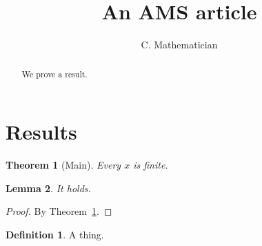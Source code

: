 \documentclass{amsart}
\title[Short]{An AMS article}
\author{C. Mathematician}
\newtheorem{theorem}{Theorem}[section]
\newtheorem{lemma}[theorem]{Lemma}
\theoremstyle{definition}
\newtheorem{definition}{Definition}
\begin{document}
\begin{abstract}
We prove a result.
\end{abstract}
\maketitle
\section{Results}
\begin{theorem}[Main]\label{t:main}
Every $x$ is finite.
\end{theorem}
\begin{lemma}
It holds.
\end{lemma}
\begin{proof}
By Theorem~\ref{t:main}. \qedhere
\end{proof}
\begin{definition}
A thing.
\end{definition}
\end{document}
